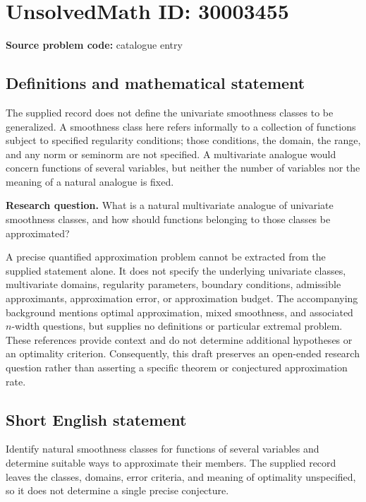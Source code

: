 \documentclass[11pt]{article}
\begin{document}
\section*{UnsolvedMath ID: 30003455}
\textbf{Source problem code:} catalogue entry
\subsection{Definitions and mathematical statement}
The supplied record does not define the univariate smoothness classes to be generalized. A smoothness class here refers informally to a collection of functions subject to specified regularity conditions; those conditions, the domain, the range, and any norm or seminorm are not specified. A multivariate analogue would concern functions of several variables, but neither the number of variables nor the meaning of a natural analogue is fixed.

\textbf{Research question.} What is a natural multivariate analogue of univariate smoothness classes, and how should functions belonging to those classes be approximated?

A precise quantified approximation problem cannot be extracted from the supplied statement alone. It does not specify the underlying univariate classes, multivariate domains, regularity parameters, boundary conditions, admissible approximants, approximation error, or approximation budget. The accompanying background mentions optimal approximation, mixed smoothness, and associated \(n\)-width questions, but supplies no definitions or particular extremal problem. These references provide context and do not determine additional hypotheses or an optimality criterion. Consequently, this draft preserves an open-ended research question rather than asserting a specific theorem or conjectured approximation rate.
\subsection{Short English statement}
Identify natural smoothness classes for functions of several variables and determine suitable ways to approximate their members. The supplied record leaves the classes, domains, error criteria, and meaning of optimality unspecified, so it does not determine a single precise conjecture.
\end{document}
